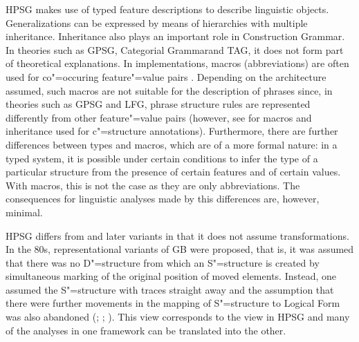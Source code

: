 HPSG makes use of typed feature descriptions to describe linguistic objects. Generalizations can be expressed by means of hierarchies with multiple inheritance.
Inheritance also plays an important role in Construction Grammar\indexcxg. In theories such as GPSG\indexgpsg, Categorial Grammar\indexcg and TAG\indextag, it
does not form part of theoretical explanations. In implementations, macros (abbreviations) are often used for co"=occuring feature"=value pairs
\citep*{DKK2004a}. Depending on the architecture assumed, such macros are not suitable for the description of phrases since, in theories such as GPSG\indexgpsg
and LFG\indexlfg, phrase structure rules are represented differently from other feature"=value pairs (however, see
 for macros and inheritance used for c"=structure annotations). Furthermore, there are further differences between types and macros, which are of a
more formal nature: in a typed system, it is possible under certain conditions to infer the type of a particular structure from the presence
of certain features and of certain values. With macros, this is not the case as they are only abbreviations. The consequences for linguistic analyses made by this differences are, however, minimal.

HPSG differs from \gbt and later variants in that it does not assume transformations. In the 80s, representational variants of GB were proposed, that is,
it was assumed that there was no D"=structure from which an S"=structure is created by simultaneous marking of the original position of moved elements.
Instead, one assumed the S"=structure with traces straight away and the assumption that there were further movements in the mapping of S"=structure to Logical
Form was also abandoned (\citealp{Koster78b-u}; \citealp[Section~1.4]{Haider93a};
\citealp[]{Frey93a}). This view corresponds to the view in HPSG and many of the analyses in one framework can be translated into the other.

